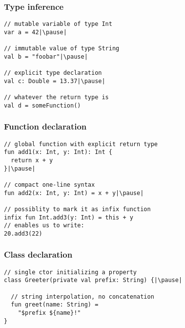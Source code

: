 

\begin{frame}[fragile] \frametitle{Type inference}
\pause
\begin{lstlisting}
// mutable variable of type Int
var a = 42|\pause|

// immutable value of type String
val b = "foobar"|\pause|

// explicit type declaration
val c: Double = 13.37|\pause|

// whatever the return type is
val d = someFunction()
\end{lstlisting}
\end{frame}


\begin{frame}[fragile] \frametitle{Function declaration}
\pause
\begin{lstlisting}
// global function with explicit return type
fun add1(x: Int, y: Int): Int {
  return x + y
}|\pause|

// compact one-line syntax
fun add2(x: Int, y: Int) = x + y|\pause|

// possiblity to mark it as infix function
infix fun Int.add3(y: Int) = this + y
// enables us to write:
20.add3(22)
\end{lstlisting}
\end{frame}


\begin{frame}[fragile] \frametitle{Class declaration}
\pause
\begin{lstlisting}
// single ctor initializing a property
class Greeter(private val prefix: String) {|\pause|

  // string interpolation, no concatenation
  fun greet(name: String) =
    "$prefix ${name}!"
}
\end{lstlisting}
\end{frame}


